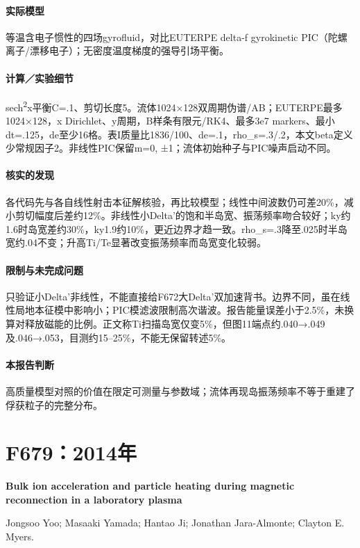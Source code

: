 \paragraph{实际模型}等温含电子惯性的四场gyrofluid，对比EUTERPE delta-f gyrokinetic PIC（陀螺离子/漂移电子）；无密度温度梯度的强导引场平衡。

\paragraph{计算／实验细节}sech\textsuperscript{2}x平衡C=.1、剪切长度5。流体1024×128双周期伪谱/AB；EUTERPE最多1024×128，x Dirichlet、y周期，B样条有限元/RK4、最多3e7 markers、最小dt=.125，de至少16格。表I质量比1836/100、de=.1，rho\_s=.3/.2，本文beta定义少常规因子2。非线性PIC保留m=0, ±1；流体初始种子与PIC噪声启动不同。

\paragraph{核实的发现}各代码先与各自线性射击本征解核验，再比较模型；线性中间波数仍可差20\%，减小剪切幅度后差约12\%。非线性小Delta'的饱和半岛宽、振荡频率吻合较好；ky约1.6时岛宽差约30\%，ky1.9约10\%，更近边界才趋一致。rho\_s=.3降至.025时半岛宽约.04不变；升高Ti/Te显著改变振荡频率而岛宽变化较弱。

\paragraph{限制与未完成问题}只验证小Delta'非线性，不能直接给F672大Delta'双加速背书。边界不同，虽在线性局地本征模中影响小；PIC模滤波限制高次谐波。报告能量误差小于2.5\%，未换算对释放磁能的比例。正文称Ti扫描岛宽仅变5\%，但图11端点约.040→.049及.046→.053，目测约15–25\%，不能无保留转述5\%。

\paragraph{本报告判断}高质量模型对照的价值在限定可测量与参数域；流体再现岛振荡频率不等于重建了俘获粒子的完整分布。

\section{F679：2014年}\label{paper:F679}

\textbf{Bulk ion acceleration and particle heating during magnetic reconnection in a laboratory plasma}\citep{F679}\

Jongsoo Yoo;  Masaaki Yamada;  Hantao Ji;  Jonathan Jara-Almonte;  Clayton E. Myers.

